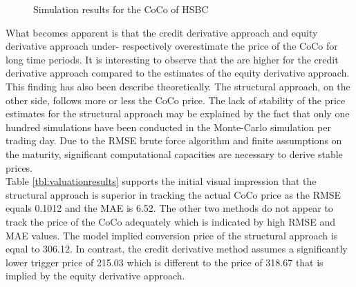 \begin{figure}[H]
\centering
{}
\caption[Simulation results for the CoCo of HSBC]{Simulation results for the CoCo of HSBC}
\label{fig:valuation}
\end{figure}

What becomes apparent is that the credit derivative approach and equity derivative approach under- respectively overestimate the price of the CoCo for long time periods. It is interesting to observe that the are higher for the credit derivative approach compared to the estimates of the equity derivative approach. This finding has also been describe theoretically. The structural approach, on the other side, follows more or less the CoCo price. The lack of stability of the price estimates for the structural approach may be explained by the fact that only one hundred simulations have been conducted in the Monte-Carlo simulation per trading day. Due to the RMSE brute force algorithm and finite assumptions on the maturity, significant computational capacities are necessary to derive stable prices. \\

Table \ref{tbl:valuationresults} supports the initial visual impression that the structural approach is superior in tracking the actual CoCo price as the RMSE equals 0.1012 and the MAE is 6.52. The other two methods do not appear to track the price of the CoCo adequately which is indicated by high RMSE and MAE values. The model implied conversion price of the structural approach is equal to 306.12. In contrast, the credit derivative method assumes a significantly lower trigger price of 215.03 which is different to the price of 318.67 that is implied by the equity derivative approach.

